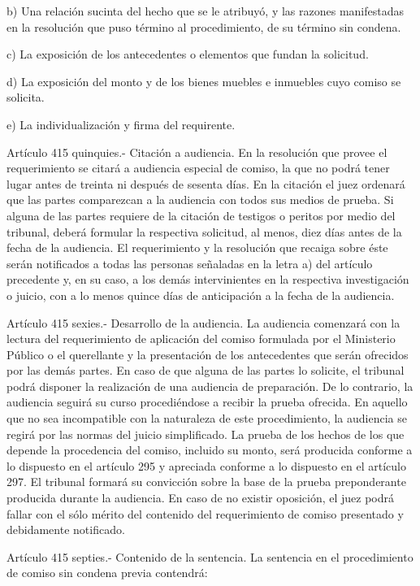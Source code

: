     b) Una relación sucinta del hecho que se le atribuyó, y las razones manifestadas en la resolución que puso término al procedimiento, de su término sin condena.

    c) La exposición de los antecedentes o elementos que fundan la solicitud.

    d) La exposición del monto y de los bienes muebles e inmuebles cuyo comiso se solicita.

    e) La individualización y firma del requirente.

    Artículo 415 quinquies.- Citación a audiencia. En la resolución que provee el requerimiento se citará a audiencia especial de comiso, la que no podrá tener lugar antes de treinta ni después de sesenta días.
    En la citación el juez ordenará que las partes comparezcan a la audiencia con todos sus medios de prueba. Si alguna de las partes requiere de la citación de testigos o peritos por medio del tribunal, deberá formular la respectiva solicitud, al menos, diez días antes de la fecha de la audiencia.
    El requerimiento y la resolución que recaiga sobre éste serán notificados a todas las personas señaladas en la letra a) del artículo precedente y, en su caso, a los demás intervinientes en la respectiva investigación o juicio, con a lo menos quince días de anticipación a la fecha de la audiencia.

    Artículo 415 sexies.- Desarrollo de la audiencia. La audiencia comenzará con la lectura del requerimiento de aplicación del comiso formulada por el Ministerio Público o el querellante y la presentación de los antecedentes que serán ofrecidos por las demás partes. En caso de que alguna de las partes lo solicite, el tribunal podrá disponer la realización de una audiencia de preparación. De lo contrario, la audiencia seguirá su curso procediéndose a recibir la prueba ofrecida.
    En aquello que no sea incompatible con la naturaleza de este procedimiento, la audiencia se regirá por las normas del juicio simplificado.
    La prueba de los hechos de los que depende la procedencia del comiso, incluido su monto, será producida conforme a lo dispuesto en el artículo 295 y apreciada conforme a lo dispuesto en el artículo 297. El tribunal formará su convicción sobre la base de la prueba preponderante producida durante la audiencia.
    En caso de no existir oposición, el juez podrá fallar con el sólo mérito del contenido del requerimiento de comiso presentado y debidamente notificado.

    Artículo 415 septies.- Contenido de la sentencia. La sentencia en el procedimiento de comiso sin condena previa contendrá:

